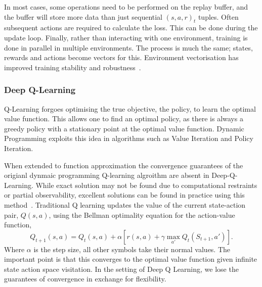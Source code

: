 In most cases, some operations need to be performed on the replay buffer, and the buffer will store more data than just sequential $(s, a,r)_t$ tuples. Often subsequent actions are required to calculate the loss. This can be done during the update loop. Finally, rather than interacting with one environment, training is done in parallel in multiple environments. The process is much the same; states, rewards and actions become vectors for this. Environment vectorisation has improved training stability and robustness~\cite{minh2016asynchronous}.

\subsubsection{Deep Q-Learning}
Q-Learning forgoes optimising the true objective, the policy, to learn the optimal value function. This allows one to find an optimal policy, as there is always a greedy policy with a stationary point at the optimal value function. Dynamic Programming exploits this idea in algorithms such as Value Iteration\cite{bellamn1957mdp} and Policy Iteration\cite{howard1960dynamic}.

When extended to function approximation the convergence guarantees of the origianl dynmaic programming Q-learning algroithm are absent in Deep-Q-Learning. While exact solution may not be found due to computational restraints or partial observability, excellent solutions can be found in practice using this method~\cite{mnih2013playing}. Traditional Q learning updates the value of the current state-action pair, $Q(s, a)$, using the Bellman optimality equation for the action-value function,
\begin{equation}
	Q_{t+1}(s, a) = Q_t(s,a) + \alpha \left[ r(s, a) + \gamma \max_{a'} Q_t(S_{t+1}, a') \right].
\end{equation}
Where $\alpha$ is the step size, all other symbols take their normal values. The important point is that this converges to the optimal value function given infinite state action space visitation. In the setting of Deep Q Learning, we lose the guarantees of convergence in exchange for flexibility.

